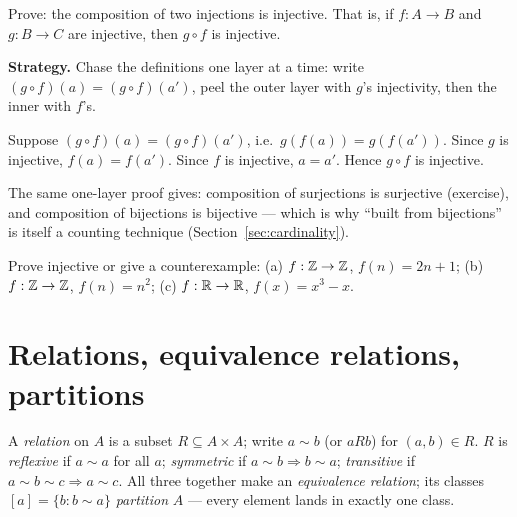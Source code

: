 \begin{example}\label{ex:compinj}
Prove: the composition of two injections is injective. That is, if
$f : A \to B$ and $g : B \to C$ are injective, then $g \circ f$ is injective.
\par\smallskip
\textbf{Strategy.} Chase the definitions one layer at a time: write
$(g \circ f)(a) = (g \circ f)(a')$, peel the outer layer with $g$'s
injectivity, then the inner with $f$'s.
\par\smallskip
\begin{solution}
Suppose $(g \circ f)(a) = (g \circ f)(a')$, i.e.\ $g(f(a)) = g(f(a'))$. Since
$g$ is injective, $f(a) = f(a')$. Since $f$ is injective, $a = a'$. Hence
$g \circ f$ is injective.
\end{solution}
\end{example}

The same one-layer proof gives: composition of surjections is surjective
(exercise), and composition of bijections is bijective --- which is why
``built from bijections'' is itself a counting technique
(Section~\ref{sec:cardinality}).

\begin{exercise}[medium]\label{exr:inj}
Prove injective or give a counterexample: (a) $f:\mathbb{Z}\to\mathbb{Z}$, $f(n)=2n+1$;
(b) $f:\mathbb{Z}\to\mathbb{Z}$, $f(n)=n^2$; (c) $f:\mathbb{R}\to\mathbb{R}$, $f(x)=x^3-x$.
\end{exercise}

\section{Relations, equivalence relations, partitions}\label{sec:relations}

\begin{definition}
A \emph{relation} on $A$ is a subset $R \subseteq A \times A$; write
$a \sim b$ (or $aRb$) for $(a,b) \in R$. $R$ is
\emph{reflexive} if $a \sim a$ for all $a$; \emph{symmetric} if
$a \sim b \Rightarrow b \sim a$; \emph{transitive} if
$a \sim b \sim c \Rightarrow a \sim c$. All three together make an
\emph{equivalence relation}; its classes
$[a] = \{b : b \sim a\}$ \emph{partition} $A$ --- every element lands in
exactly one class.
\end{definition}

